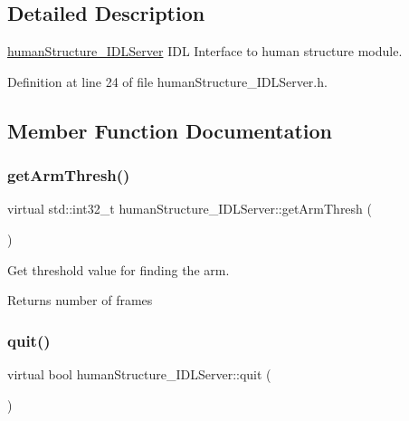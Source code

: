 \subsection{Detailed Description}
\hyperlink{classhumanStructure__IDLServer}{human\+Structure\+\_\+\+I\+D\+L\+Server} I\+DL Interface to human structure module. 

Definition at line 24 of file human\+Structure\+\_\+\+I\+D\+L\+Server.\+h.



\subsection{Member Function Documentation}
\mbox{\label{classhumanStructure__IDLServer_ad369af528fab47cf8ae4f14c0ab5e0ce}} 
\subsubsection{\texorpdfstring{get\+Arm\+Thresh()}{getArmThresh()}}
{\footnotesize\ttfamily virtual std\+::int32\+\_\+t human\+Structure\+\_\+\+I\+D\+L\+Server\+::get\+Arm\+Thresh (\begin{DoxyParamCaption}{ }\end{DoxyParamCaption})\hspace{0.3cm}{\ttfamily [virtual]}}



Get threshold value for finding the arm. 

\begin{DoxyReturn}{Returns}
number of frames 
\end{DoxyReturn}
\mbox{\label{classhumanStructure__IDLServer_a3573f22d04a104ee0052bb162190845f}} 
\subsubsection{\texorpdfstring{quit()}{quit()}}
{\footnotesize\ttfamily virtual bool human\+Structure\+\_\+\+I\+D\+L\+Server\+::quit (\begin{DoxyParamCaption}{ }\end{DoxyParamCaption})\hspace{0.3cm}{\ttfamily [virtual]}}



